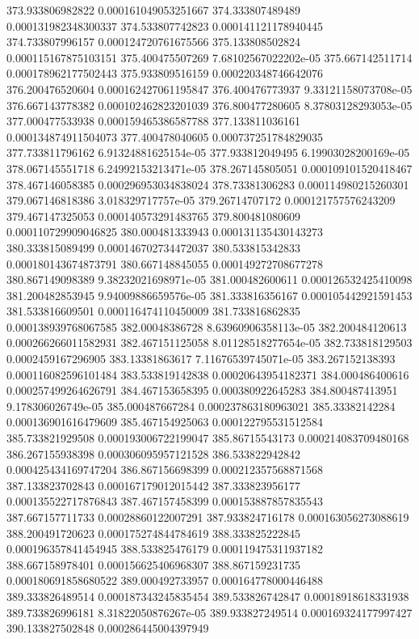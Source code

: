 {373.933806982822 0.000161049053251667
374.333807489489 0.000131982348300337
374.533807742823 0.000141121178940445
374.733807996157 0.000124720761675566
375.133808502824 0.000115167875103151
375.400475507269 7.68102567022202e-05
375.667142511714 0.000178962177502443
375.933809516159 0.000220348746642076
376.200476520604 0.000162427061195847
376.400476773937 9.33121158073708e-05
376.667143778382 0.000102462823201039
376.800477280605 8.37803128293053e-05
377.000477533938 0.000159465386587788
377.133811036161 0.000134874911504073
377.400478040605 0.000737251784829035
377.733811796162 6.91324881625154e-05
377.933812049495 6.19903028200169e-05
378.067145551718 6.24992153213471e-05
378.267145805051 0.000109101520418467
378.467146058385 0.000296953034838024
378.73381306283 0.000114980215260301
379.067146818386 3.018329717757e-05
379.26714707172 0.000121757576243209
379.467147325053 0.000140573291483765
379.800481080609 0.000110729909046825
380.000481333943 0.000131135430143273
380.333815089499 0.000146702734472037
380.533815342833 0.000180143674873791
380.667148845055 0.000149272708677278
380.867149098389 9.38232021698971e-05
381.000482600611 0.000126532425410098
381.200482853945 9.94009886659576e-05
381.333816356167 0.000105442921591453
381.533816609501 0.000116474110450009
381.733816862835 0.000138939768067585
382.00048386728 8.63960906358113e-05
382.200484120613 0.000266266011582931
382.467151125058 8.01128518277654e-05
382.733818129503 0.0002459167296905
383.13381863617 7.11676539745071e-05
383.267152138393 0.000116082596101484
383.533819142838 0.00020643954182371
384.000486400616 0.000257499264626791
384.467153658395 0.000380922645283
384.800487413951 9.178306026749e-05
385.000487667284 0.000237863180963021
385.33382142284 0.000136901616479609
385.467154925063 0.000122795531512584
385.733821929508 0.000193006722199047
385.86715543173 0.000214083709480168
386.267155938398 0.000306095957121528
386.533822942842 0.000425434169747204
386.867156698399 0.000212357568871568
387.133823702843 0.000167179012015442
387.333823956177 0.000135522717876843
387.467157458399 0.000153887857835543
387.667157711733 0.00028860122007291
387.933824716178 0.000163056273088619
388.200491720623 0.000175274844784619
388.333825222845 0.000196357841454945
388.533825476179 0.000119475311937182
388.667158978401 0.000156625406968307
388.867159231735 0.000180691858680522
389.000492733957 0.000164778000446488
389.333826489514 0.000187343245835454
389.533826742847 0.00018918618331938
389.733826996181 8.31822050876267e-05
389.933827249514 0.000169324177997427
390.133827502848 0.000286445004397949
}
